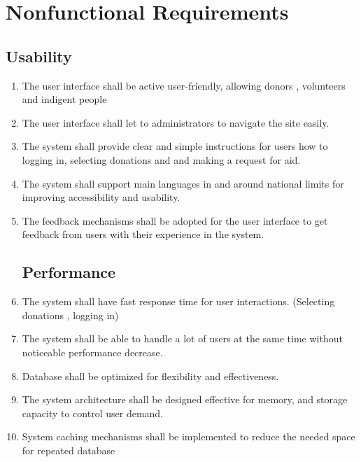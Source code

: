 \documentclass[a4paper,12pt]{report}
\begin{document}
	\chapter{Nonfunctional Requirements}
	\section{Usability}
        \begin{enumerate}
	        \item The user interface shall be active   user-friendly, allowing donors , volunteers and indigent people
	 	
	 	\item The user interface shall let to administrators to navigate the site easily.
	 	
	        \item The system shall provide clear and simple  instructions for users how to logging in, selecting donations and and making a request for aid. 
	 	
	 	\item The system shall support main languages in and around national limits for improving accessibility and usability.
	 	
	 	\item The feedback mechanisms shall be adopted for the user interface to get feedback from users with their experience in the system.
   
	\section{Performance}
                \item The system shall have fast response time  for user interactions. (Selecting donations , logging in)
	     
	        \item The system shall be able to handle a lot of users at the same time without noticeable performance decrease.
	     
	        \item Database shall be optimized for flexibility and effectiveness.
	      
	        \item The system architecture shall be designed effective for  memory, and storage capacity to control user demand.
	     
	        \item System caching mechanisms shall be implemented to reduce the needed space for repeated database 
	 

\end{enumerate}
\end{document}
